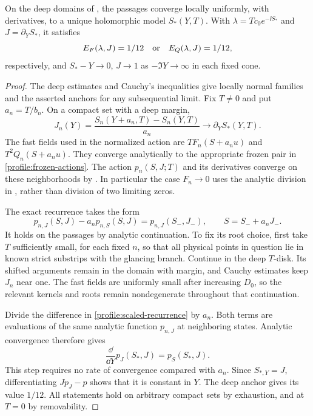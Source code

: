 \begin{lemma}
\label{profile:energy-model}
On the deep domains of , the passages converge
locally uniformly, with derivatives, to a unique holomorphic model
\(S_*(Y,T)\). With \(\lambda=Tc_0e^{-\ii S_*}\) and
\(J=\partial_Y S_*\), it satisfies
\begin{equation}
 \label{profile:energy-equation}
 E_F(\lambda,J)=1/12
 \quad\hbox{or}\quad E_Q(\lambda,J)=1/12,
\end{equation}
respectively, and \(S_*-Y\to0\), \(J\to1\) as
\(-\Im Y\to\infty\) in each fixed cone.
\end{lemma}

\begin{proof}
The deep estimates and Cauchy's inequalities give locally normal
families and the asserted anchors for any subsequential limit. Fix
\(T\ne0\) and put \(a_n=T/b_n\). On a compact set with a deep
margin,
\[
 J_n(Y)=\frac{S_n(Y+a_n,T)-S_n(Y,T)}{a_n}
       \longrightarrow\partial_Y S_*(Y,T).
\]
The fast fields used in the normalized action are
\(TF_n(S+a_nu)\) and \(T^2Q_n(S+a_nu)\). They converge analytically
to the appropriate frozen pair in
\eqref{profile:frozen-actions}. The action \(p_n(S,J;T)\) and its
derivatives converge on these neighborhoods by
. In particular the case
\(F_n\to0\) uses the analytic division in
, rather than division of two limiting
zeros.

The exact recurrence takes the form
\begin{equation}
 \label{profile:scaled-recurrence}
 p_{n,J}(S,J)-a_np_{n,S}(S,J)
   =p_{n,J}(S_-,J_-),\qquad S=S_-+a_nJ_-.
\end{equation}
It holds on the passages by analytic continuation. To fix its root
choice, first take \(T\) sufficiently small, for each fixed \(n\),
so that all physical points in question lie in known strict
substrips with the glancing branch. Continue in the deep \(T\)-disk.
Its shifted arguments remain in the domain with margin, and Cauchy
estimates keep \(J_n\) near one. The fast fields are uniformly small
after increasing \(D_0\), so the relevant kernels and roots remain
nondegenerate throughout that continuation.

Divide the difference in \eqref{profile:scaled-recurrence} by
\(a_n\). Both terms are evaluations of the same analytic function
\(p_{n,J}\) at neighboring states. Analytic convergence therefore
gives
\[
 \frac{\dd}{\dd Y}p_J(S_*,J)=p_S(S_*,J).
\]
This step requires no rate of convergence compared with \(a_n\).
Since \(S_{*,Y}=J\), differentiating \(Jp_J-p\) shows that it is
constant in \(Y\). The deep anchor gives its value \(1/12\).
All statements hold on arbitrary compact sets by exhaustion, and at
\(T=0\) by removability.


\end{proof}
